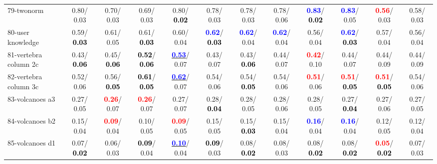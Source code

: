\begin{table}[h]
\begin{center}
{\begin{tabular}{lc|c|c|c|c|c|c|c|c|c|c}
79-twonorm &   0.80/  0.03 &   0.70/  0.03 &   0.69/  0.03 &   0.80/\textcolor{black}{\textbf{  0.02}} &   0.78/  0.03 &   0.78/  0.03 &   0.78/  0.06 & \textcolor{blue}{\textbf{  0.83}}/\textcolor{black}{\textbf{  0.02}} & \textcolor{blue}{\textbf{  0.83}}/  0.05 & \textcolor{red}{\textbf{  0.56}}/  0.03 &   0.58/  0.03 \\
80-user knowledge &   0.59/\textcolor{black}{\textbf{  0.03}} &   0.61/  0.05 &   0.61/\textcolor{black}{\textbf{  0.03}} &   0.60/  0.04 & \textcolor{blue}{\textbf{  0.62}}/\textcolor{black}{\textbf{  0.03}} & \textcolor{blue}{\textbf{  0.62}}/  0.04 & \textcolor{blue}{\textbf{  0.62}}/  0.04 &   0.56/  0.04 & \textcolor{blue}{\textbf{  0.62}}/\textcolor{black}{\textbf{  0.03}} &   0.57/  0.04 &   0.56/  0.04 \\
81-vertebra column 2c &   0.43/\textcolor{black}{\textbf{  0.06}} &   0.45/\textcolor{black}{\textbf{  0.06}} & \textcolor{black}{\textbf{  0.52}}/\textcolor{black}{\textbf{  0.06}} & \underline{\textcolor{blue}{\textbf{  0.53}}}/  0.07 &   0.43/  0.07 &   0.43/\textcolor{black}{\textbf{  0.06}} &   0.44/  0.07 & \textcolor{red}{\textbf{  0.42}}/  0.10 &   0.44/  0.07 &   0.44/  0.09 &   0.44/  0.09 \\
82-vertebra column 3c &   0.52/  0.06 &   0.56/\textcolor{black}{\textbf{  0.05}} & \textcolor{black}{\textbf{  0.61}}/\textcolor{black}{\textbf{  0.05}} & \underline{\textcolor{blue}{\textbf{  0.62}}}/  0.07 &   0.54/  0.06 &   0.54/\textcolor{black}{\textbf{  0.05}} &   0.54/  0.06 & \textcolor{red}{\textbf{  0.51}}/  0.06 & \textcolor{red}{\textbf{  0.51}}/\textcolor{black}{\textbf{  0.05}} & \textcolor{red}{\textbf{  0.51}}/\textcolor{black}{\textbf{  0.05}} &   0.54/  0.06 \\
83-volcanoes a3 &   0.27/  0.05 & \textcolor{red}{\textbf{  0.26}}/  0.07 & \textcolor{red}{\textbf{  0.26}}/  0.07 &   0.27/  0.07 &   0.28/\textcolor{black}{\textbf{  0.04}} &   0.28/  0.05 &   0.28/  0.06 &   0.28/  0.05 &   0.27/\textcolor{black}{\textbf{  0.04}} &   0.27/  0.06 &   0.27/  0.05 \\
84-volcanoes b2 &   0.15/  0.04 & \textcolor{red}{\textbf{  0.09}}/  0.04 &   0.10/  0.05 & \textcolor{red}{\textbf{  0.09}}/  0.05 &   0.15/  0.05 &   0.15/\textcolor{black}{\textbf{  0.03}} &   0.15/  0.04 & \textcolor{blue}{\textbf{  0.16}}/  0.04 & \textcolor{blue}{\textbf{  0.16}}/  0.04 &   0.12/  0.05 &   0.12/  0.04 \\
85-volcanoes d1 &   0.07/\textcolor{black}{\textbf{  0.02}} &   0.06/  0.03 & \textcolor{black}{\textbf{  0.09}}/  0.04 & \underline{\textcolor{blue}{\textbf{  0.10}}}/  0.04 & \textcolor{black}{\textbf{  0.09}}/  0.03 &   0.08/\textcolor{black}{\textbf{  0.02}} &   0.08/  0.03 &   0.08/\textcolor{black}{\textbf{  0.02}} &   0.08/\textcolor{black}{\textbf{  0.02}} & \textcolor{red}{\textbf{  0.05}}/\textcolor{black}{\textbf{  0.02}} &   0.07/  0.03 \\ \hline

\end{tabular}}
\end{center}
\end{table}
